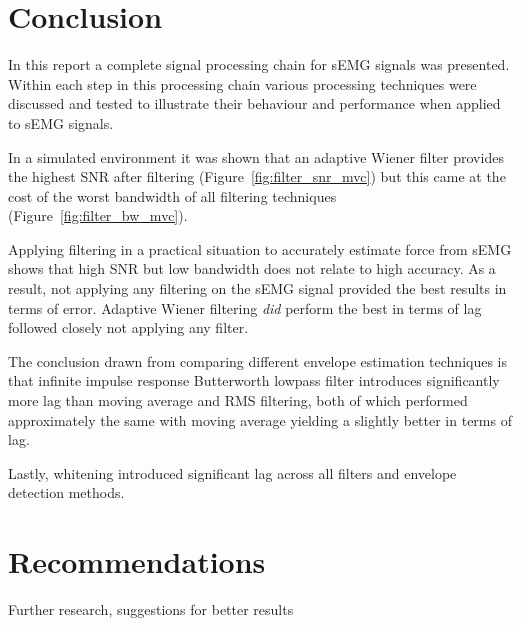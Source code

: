 \section{Conclusion}
In this report a complete signal processing chain for sEMG signals was presented. Within each step in this processing chain various processing techniques were discussed and tested to illustrate their behaviour and performance when applied to sEMG signals.

In a simulated environment it was shown that an adaptive Wiener filter provides the highest SNR after filtering (Figure~\ref{fig:filter_snr_mvc}) but this came at the cost of the worst bandwidth of all filtering techniques (Figure~\ref{fig:filter_bw_mvc}).

Applying filtering in a practical situation to accurately estimate force from sEMG shows that high SNR but low bandwidth does not relate to high accuracy. As a result, not applying any filtering on the sEMG signal provided the best results in terms of error. Adaptive Wiener filtering \textit{did} perform the best in terms of lag followed closely not applying any filter. 

The conclusion drawn from comparing different envelope estimation techniques is that infinite impulse response Butterworth lowpass filter introduces significantly more lag than moving average and RMS filtering, both of which performed approximately the same with moving average yielding a slightly better in terms of lag.

Lastly, whitening introduced significant lag across all filters and envelope detection methods.

\section{Recommendations}
Further research, suggestions for better results